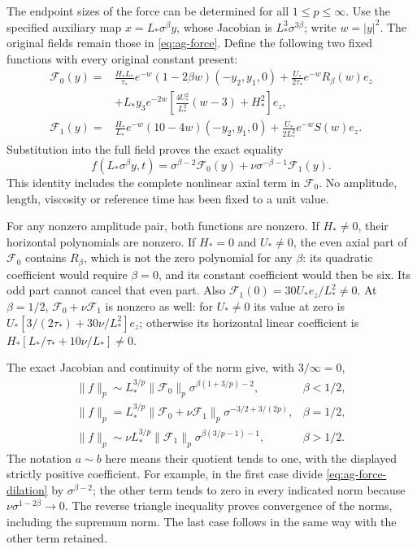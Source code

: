 The endpoint sizes of the force can be determined for all \(1\leq p\leq\infty\).
Use the specified auxiliary map \(x=L_*\sigma^\beta y\), whose
Jacobian is \(L_*^3\sigma^{3\beta}\); write \(w=|y|^2\).
The original fields remain those in \eqref{eq:ag-force}.  Define the
following two fixed functions with every original constant present:
\begin{align}
 \mathscr F_0(y)={}&
 \frac{H_*L_*}{\tau_*}e^{-w}(1-2\beta w)(-y_2,y_1,0)
       +\frac{U_*}{2\tau_*}e^{-w}R_\beta(w)e_z\nonumber\\
 &+L_*y_3e^{-2w}
       \left[\frac{4U_*^2}{L_*^2}(w-3)+H_*^2\right]e_z,
       \label{eq:ag-force-shape-zero}\\
 \mathscr F_1(y)={}&
 \frac{H_*}{L_*}e^{-w}(10-4w)(-y_2,y_1,0)
       +\frac{U_*}{2L_*^2}e^{-w}S(w)e_z.
       \label{eq:ag-force-shape-one}
\end{align}
Substitution into the full field proves the exact equality
\begin{equation}\label{eq:ag-force-dilation}
 f(L_*\sigma^\beta y,t)
   =\sigma^{\beta-2}\mathscr F_0(y)
           +\nu\sigma^{-\beta-1}\mathscr F_1(y).
\end{equation}
This identity includes the complete nonlinear axial term in
\(\mathscr F_0\).  No amplitude, length, viscosity or reference time
has been fixed to a unit value.

For any nonzero amplitude pair, both functions are nonzero.  If
\(H_*\ne0\), their horizontal polynomials are nonzero.  If \(H_*=0\)
and \(U_*\ne0\), the even axial part of \(\mathscr F_0\) contains
\(R_\beta\), which is not the zero polynomial for any \(\beta\):
its quadratic coefficient would require \(\beta=0\), and its constant
coefficient would then be six.  Its odd part cannot cancel that even
part.  Also \(\mathscr F_1(0)=30U_*e_z/L_*^2\ne0\).
At \(\beta=1/2\), \(\mathscr F_0+\nu\mathscr F_1\) is nonzero as
well: for \(U_*\ne0\) its value at zero is
\(U_*[3/(2\tau_*)+30\nu/L_*^2]e_z\); otherwise its horizontal
linear coefficient is \(H_*[L_*/\tau_*+10\nu/L_*]\ne0\).

The exact Jacobian and continuity of the norm give, with \(3/\infty=0\),
\begin{equation}\label{eq:ag-force-Lp-asymptotics}
 \begin{array}{ll}
 \displaystyle\|f\|_p\sim L_*^{3/p}\|\mathscr F_0\|_p
     \sigma^{\beta(1+3/p)-2},&\beta<1/2,\\[4pt]
 \displaystyle\|f\|_p=L_*^{3/p}\|\mathscr F_0+\nu\mathscr F_1\|_p
     \sigma^{-3/2+3/(2p)},&\beta=1/2,\\[4pt]
 \displaystyle\|f\|_p\sim\nu L_*^{3/p}\|\mathscr F_1\|_p
     \sigma^{\beta(3/p-1)-1},&\beta>1/2.
 \end{array}
\end{equation}
The notation \(a\sim b\) here means their quotient tends to one, with
the displayed strictly positive coefficient.  For example, in the first
case divide \eqref{eq:ag-force-dilation} by \(\sigma^{\beta-2}\);
the other term tends to zero in every indicated norm because
\(\nu\sigma^{1-2\beta}\to0\).  The reverse triangle inequality
proves convergence of the norms, including the supremum norm.
The last case follows in the same way with the other term retained.

